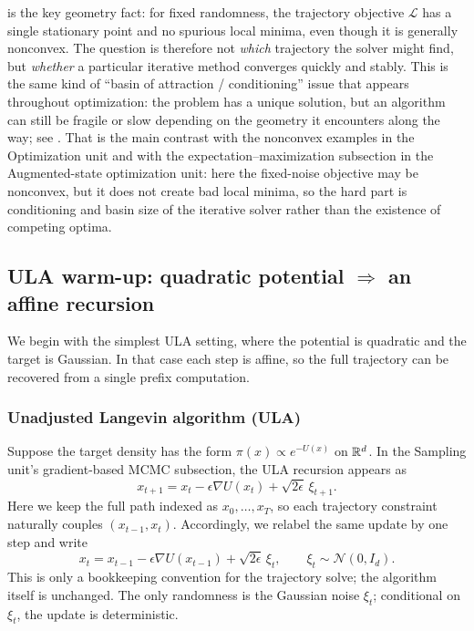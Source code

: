 \documentclass[11pt]{article}
\begin{document}
 is the key geometry fact:
for fixed randomness, the trajectory objective $\mathcal{L}$ has a single stationary point and no spurious local minima, even though it is generally nonconvex.
The question is therefore not \emph{which} trajectory the solver might find, but \emph{whether} a particular iterative method converges quickly and stably.
This is the same kind of ``basin of attraction / conditioning'' issue that appears throughout optimization: the problem has a unique solution, but an algorithm can still be fragile or slow depending on the geometry it encounters along the way; see .
That is the main contrast with the nonconvex examples in the Optimization unit and with the expectation--maximization subsection in the Augmented-state optimization unit: here the fixed-noise objective may be nonconvex, but it does not create bad local minima, so the hard part is conditioning and basin size of the iterative solver rather than the existence of competing optima.

\subsection{ULA warm-up: quadratic potential \texorpdfstring{$\Rightarrow$}{=>} an affine recursion}
\label{subsec:warmup-affine}

We begin with the simplest ULA setting, where the potential is quadratic and the target is Gaussian.
In that case each step is affine, so the full trajectory can be recovered from a single prefix computation.

\subsubsection{Unadjusted Langevin algorithm (ULA)}
\label{subsubsec:parallel-mcmc-ula}

Suppose the target density has the form $\pi(x)\propto e^{-U(x)}$ on $\mathbb{R}^d$.
In the Sampling unit's gradient-based MCMC subsection, the ULA recursion appears as
\[
x_{t+1}=x_t-\epsilon \nabla U(x_t)+\sqrt{2\epsilon}\,\xi_{t+1}.
\]
Here we keep the full path indexed as $x_0,\dots,x_T$, so each trajectory constraint naturally couples $(x_{t-1},x_t)$.
Accordingly, we relabel the same update by one step and write
\begin{equation}
  x_t = x_{t-1} - \epsilon \nabla U(x_{t-1}) + \sqrt{2\epsilon}\,\xi_t,
  \qquad \xi_t \sim \mathcal{N}(0,I_d).
  \label{eq:ula-update}
\end{equation}
This is only a bookkeeping convention for the trajectory solve; the algorithm itself is unchanged.
The only randomness is the Gaussian noise $\xi_t$; conditional on $\xi_t$, the update is deterministic.
\end{document}
